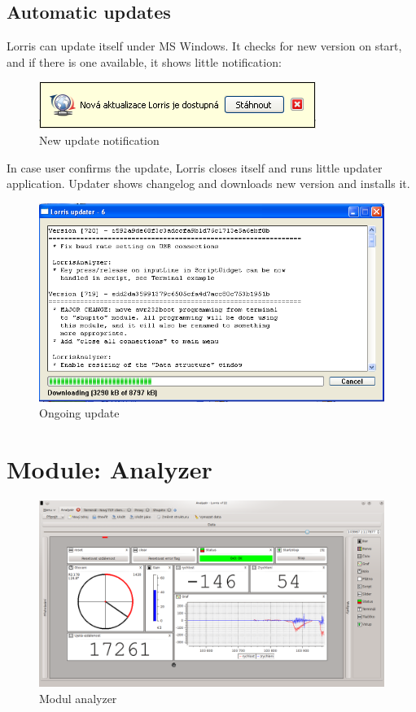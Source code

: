 \documentclass[12pt, a4paper, oneside]{article}
\begin{document}
\subsection{Automatic updates}
Lorris can update itself under MS Windows. It checks for new version on start, and if there is one available, it shows little notification:
\begin{figure}[H]
\begin{center}
\includegraphics[scale=1]{img/update_notify.png}
\caption{New update notification}
\end{center}
\end{figure}
In case user confirms the update, Lorris closes itself and runs little updater application. Updater shows changelog and downloads new version and installs it.
\begin{figure}[H]
\begin{center}
\includegraphics[width=\textwidth]{img/updater.png}
\caption{Ongoing update}
\end{center}
\end{figure}

\newpage
\section{Module: Analyzer}

\begin{figure}[h]
\begin{center}
\includegraphics[width=\textwidth]{img/analyzer_all.png}
\caption{Modul analyzer}
\label{Analyzer}
\end{center}
\end{figure}
\end{document}
